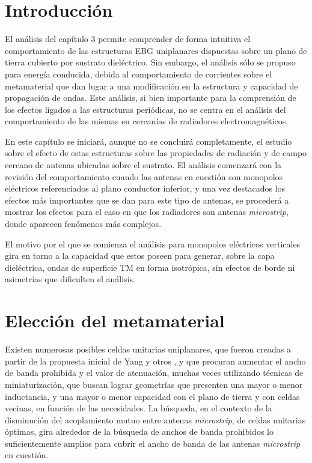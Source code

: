 

\section{Introducción}

El análisis del capítulo 3 permite comprender de forma intuitiva el comportamiento de las estructuras EBG uniplanares dispuestas sobre un plano de tierra cubierto por sustrato dieléctrico. Sin embargo, el análisis sólo se propuso para energía conducida, debida al comportamiento de corrientes sobre el metamaterial que dan lugar a una modificación en la estructura y capacidad de propagación de ondas. Este análisis, si bien importante para la comprensión de los efectos ligados a las estructuras periódicas, no se centra en el análisis del comportamiento de las mismas en cercanías de radiadores electromagnéticos.

En este capítulo se iniciará, aunque no se concluirá completamente, el estudio sobre el efecto de estas estructuras sobre las propiedades de radiación y de campo cercano de antenas ubicadas sobre el sustrato. El análisis comenzará con la revisión del comportamiento cuando las antenas en cuestión son monopolos eléctricos referenciados al plano conductor inferior, y una vez destacados los efectos más importantes que se dan para este tipo de antenas, se procederá a mostrar los efectos para el caso en que los radiadores son antenas \textit{microstrip}, donde aparecen fenómenos más complejos.

El motivo por el que se comienza el análisis para monopolos eléctricos verticales gira en torno a la capacidad que estos poseen para generar, sobre la capa dieléctrica, ondas de superficie TM en forma isotrópica, sin efectos de borde ni asimetrías que dificulten el análisis.

\section{Elección del metamaterial}
\label{sec_eleccion}

Existen numerosas posibles celdas unitarias uniplanares, que fueron creadas a partir de la propuesta inicial de Yang y otros \cite{Yang:UCPBG}, y que procuran aumentar el ancho de banda prohibida y el valor de atenuación, muchas veces utilizando técnicas de miniaturización, que buscan lograr geometrías que presenten una mayor o menor inductancia, y una mayor o menor capacidad con el plano de tierra y con celdas vecinas, en función de las necesidades. La búsqueda, en el contexto de la disminución del acoplamiento mutuo entre antenas \textit{microstrip}, de celdas unitarias óptimas, gira alrededor de la búsqueda de anchos de banda prohibidos lo suficientemente amplios para cubrir el ancho de banda de las antenas \textit{microstrip} en cuestión.

